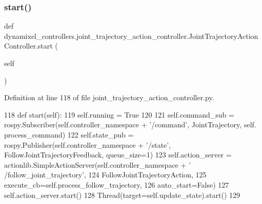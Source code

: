 \subsubsection{\texorpdfstring{start()}{start()}}
{\footnotesize\ttfamily def dynamixel\+\_\+controllers.\+joint\+\_\+trajectory\+\_\+action\+\_\+controller.\+Joint\+Trajectory\+Action\+Controller.\+start (\begin{DoxyParamCaption}\item[{}]{self }\end{DoxyParamCaption})}



Definition at line 118 of file joint\+\_\+trajectory\+\_\+action\+\_\+controller.\+py.


\begin{DoxyCode}
118     \textcolor{keyword}{def }start(self):
119         self.running = \textcolor{keyword}{True}
120         
121         self.command\_sub = rospy.Subscriber(self.controller\_namespace + \textcolor{stringliteral}{'/command'}, JointTrajectory, self.
      process\_command)
122         self.state\_pub = rospy.Publisher(self.controller\_namespace + \textcolor{stringliteral}{'/state'}, 
      FollowJointTrajectoryFeedback, queue\_size=1)
123         self.action\_server = actionlib.SimpleActionServer(self.controller\_namespace + \textcolor{stringliteral}{'
      /follow\_joint\_trajectory'},
124                                                           FollowJointTrajectoryAction,
125                                                           execute\_cb=self.process\_follow\_trajectory,
126                                                           auto\_start=\textcolor{keyword}{False})
127         self.action\_server.start()
128         Thread(target=self.update\_state).start()
129 
\end{DoxyCode}
\mbox{\label{classdynamixel__controllers_1_1joint__trajectory__action__controller_1_1_joint_trajectory_action_controller_a88b8801366d5ebdcbb1cc3a975bec4df}} 
